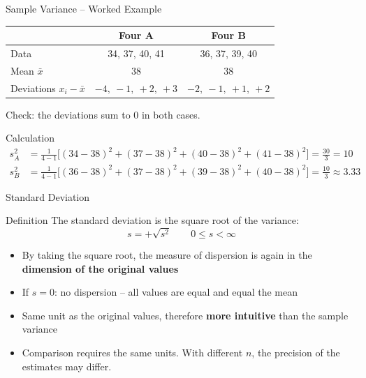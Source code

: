 \documentclass[aspectratio=169,11pt]{beamer}
\begin{document}
\begin{frame}{Sample Variance -- Worked Example}
  \begin{center}
    \begin{tabular}{lcc}
      \toprule
      & \textbf{Four A} & \textbf{Four B} \\
      \midrule
      Data & 34, 37, 40, 41 & 36, 37, 39, 40 \\
      Mean $\bar{x}$ & 38 & 38 \\
      Deviations $x_i - \bar{x}$ & $-4,\ -1,\ +2,\ +3$ & $-2,\ -1,\ +1,\ +2$ \\
      \bottomrule
    \end{tabular}
  \end{center}

  {\small Check: the deviations sum to $0$ in both cases.}

  \begin{exampleblock}{Calculation}
    \begin{align*}
      s^2_A &= \frac{1}{4-1}\bigl[(34-38)^2 + (37-38)^2 + (40-38)^2 + (41-38)^2\bigr] = \frac{30}{3} = 10 \\[4pt]
      s^2_B &= \frac{1}{4-1}\bigl[(36-38)^2 + (37-38)^2 + (39-38)^2 + (40-38)^2\bigr] = \frac{10}{3} \approx 3.33
    \end{align*}
  \end{exampleblock}
\end{frame}

\begin{frame}{Standard Deviation}
  \begin{block}{Definition}
    The standard deviation is the square root of the variance:
    \[ s = +\sqrt{s^2} \qquad 0 \leq s < \infty \]
  \end{block}

  \begin{itemize}
    \item By taking the square root, the measure of dispersion is again in the \textbf{dimension of the original values}
    \item If $s = 0$: no dispersion -- all values are equal and equal the mean
    \item Same unit as the original values, therefore \textbf{more intuitive} than the sample variance
    \item Comparison requires the same units. With different $n$, the precision of the estimates may differ.
  \end{itemize}

\end{frame}
\end{document}
